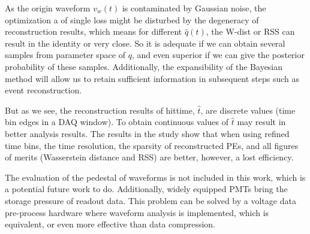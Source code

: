 
As the origin waveform $v_{w}(t)$ is contaminated by Gaussian noise, the optimization a of single loss might be disturbed by the degeneracy of reconstruction results, which means for different $\hat{q}(t)$, the W-dist or RSS can result in the identity or very close. So it is adequate if we can obtain several samples from parameter space of $q$, and even superior if we can give the posterior probability of these samples. Additionally, the expansibility of the Bayesian method will allow us to retain sufficient information in subsequent steps such as event reconstruction. 


But as we see, the reconstruction results of hittime, $\hat{t}$, are discrete values (time bin edges in a DAQ window). To obtain continuous values of $\hat{t}$ may result in better analysis results. The results in the study show that when using refined time bins, the time resolution, the sparsity of reconstructed PEs, and all figures of merits (Wasserstein distance and RSS) are better, however, a lost efficiency. 


The evaluation of the pedestal of waveforms is not included in this work, which is a potential future work to do. Additionally, widely equipped PMTs bring the storage pressure of readout data. This problem can be solved by a voltage data pre-process hardware where waveform analysis is implemented, which is equivalent, or even more effective than data compression. 

